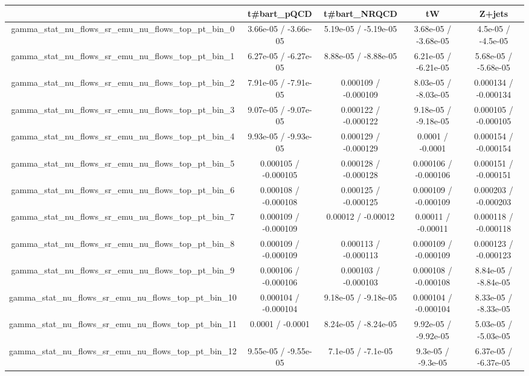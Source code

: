 \documentclass[10pt]{article}
\begin{document}
\begin{table}[htbp]
\begin{center}
\begin{tabular}{|c|c|c|c|c|}
\hline 
      & t#bar{t}_{pQCD}      & t#bar{t}_{NRQCD}      & tW      & Z+jets \\ 
\hline 
  gamma_stat_nu_flows_sr_emu_nu_flows_top_pt_bin_0 & 3.66e-05 / -3.66e-05 & 5.19e-05 / -5.19e-05 & 3.68e-05 / -3.68e-05 & 4.5e-05 / -4.5e-05 \\ 
  gamma_stat_nu_flows_sr_emu_nu_flows_top_pt_bin_1 & 6.27e-05 / -6.27e-05 & 8.88e-05 / -8.88e-05 & 6.21e-05 / -6.21e-05 & 5.68e-05 / -5.68e-05 \\ 
  gamma_stat_nu_flows_sr_emu_nu_flows_top_pt_bin_2 & 7.91e-05 / -7.91e-05 & 0.000109 / -0.000109 & 8.03e-05 / -8.03e-05 & 0.000134 / -0.000134 \\ 
  gamma_stat_nu_flows_sr_emu_nu_flows_top_pt_bin_3 & 9.07e-05 / -9.07e-05 & 0.000122 / -0.000122 & 9.18e-05 / -9.18e-05 & 0.000105 / -0.000105 \\ 
  gamma_stat_nu_flows_sr_emu_nu_flows_top_pt_bin_4 & 9.93e-05 / -9.93e-05 & 0.000129 / -0.000129 & 0.0001 / -0.0001 & 0.000154 / -0.000154 \\ 
  gamma_stat_nu_flows_sr_emu_nu_flows_top_pt_bin_5 & 0.000105 / -0.000105 & 0.000128 / -0.000128 & 0.000106 / -0.000106 & 0.000151 / -0.000151 \\ 
  gamma_stat_nu_flows_sr_emu_nu_flows_top_pt_bin_6 & 0.000108 / -0.000108 & 0.000125 / -0.000125 & 0.000109 / -0.000109 & 0.000203 / -0.000203 \\ 
  gamma_stat_nu_flows_sr_emu_nu_flows_top_pt_bin_7 & 0.000109 / -0.000109 & 0.00012 / -0.00012 & 0.00011 / -0.00011 & 0.000118 / -0.000118 \\ 
  gamma_stat_nu_flows_sr_emu_nu_flows_top_pt_bin_8 & 0.000109 / -0.000109 & 0.000113 / -0.000113 & 0.000109 / -0.000109 & 0.000123 / -0.000123 \\ 
  gamma_stat_nu_flows_sr_emu_nu_flows_top_pt_bin_9 & 0.000106 / -0.000106 & 0.000103 / -0.000103 & 0.000108 / -0.000108 & 8.84e-05 / -8.84e-05 \\ 
  gamma_stat_nu_flows_sr_emu_nu_flows_top_pt_bin_10 & 0.000104 / -0.000104 & 9.18e-05 / -9.18e-05 & 0.000104 / -0.000104 & 8.33e-05 / -8.33e-05 \\ 
  gamma_stat_nu_flows_sr_emu_nu_flows_top_pt_bin_11 & 0.0001 / -0.0001 & 8.24e-05 / -8.24e-05 & 9.92e-05 / -9.92e-05 & 5.03e-05 / -5.03e-05 \\ 
  gamma_stat_nu_flows_sr_emu_nu_flows_top_pt_bin_12 & 9.55e-05 / -9.55e-05 & 7.1e-05 / -7.1e-05 & 9.3e-05 / -9.3e-05 & 6.37e-05 / -6.37e-05 \\ 

\end{tabular}
\end{center}
\end{table}
\end{document}
